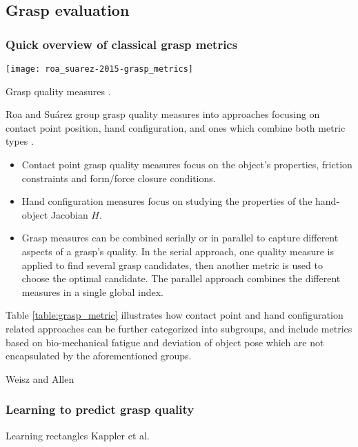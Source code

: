 \subsection{Grasp evaluation}

\subsubsection*{Quick overview of classical grasp metrics}
\begin{table}[H]
    \texttt{[image: roa\_suarez-2015-grasp\_metrics]}
    \caption{Grasp quality measures \cite{Roa2015}.}
    \label{table:grasp_metric}
\end{table}

Roa and Su{\'a}rez group grasp quality measures into approaches focusing on contact point position, hand configuration, and ones which combine both metric types \cite{Roa2015}.
\begin{itemize}
    \item Contact point grasp quality measures focus on the object's properties, friction constraints and form/force closure conditions.
    \item Hand configuration measures focus on studying the properties of the hand-object Jacobian $H$.
    \item Grasp measures can be combined serially or in parallel to capture different aspects of a grasp's quality. In the serial approach, one quality measure is applied to find several grasp candidates, then another metric is used to choose the optimal candidate. The parallel approach combines the different measures in a single global index.
\end{itemize}
Table \ref{table:grasp_metric} illustrates how contact point and hand configuration related approaches can be further categorized into subgroups, and include metrics based on bio-mechanical fatigue and deviation of object pose which are not encapsulated by the aforementioned groups.

Weisz and Allen \cite{WeiszAllen2012}

\subsubsection*{Learning to predict grasp quality}
Learning rectangles \cite{mahler2017,jiang2011,lenz2015}
Kappler et al. \cite{Kappler2015}

